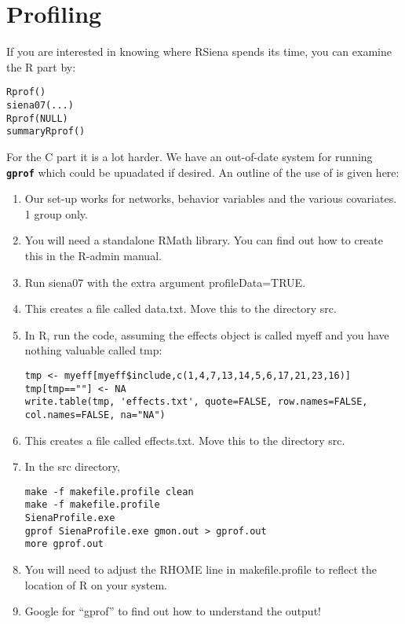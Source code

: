 \documentclass[12pt, a4paper]{article}
\renewcommand{\=}{\,=\,}
\newcommand{\+}{\,+\,}
\newcommand{\sfn}[1]{\textbf{\texttt{#1}}}
\begin{document}
\section{Profiling}
If you are interested in knowing where RSiena spends its time, you can examine
the R part by:
\begin{verbatim}
Rprof()
siena07(...)
Rprof(NULL)
summaryRprof()
\end{verbatim}
For the C part it is a lot harder. We have an out-of-date system for running
\sfn{gprof} which could be upuadated if desired.  An outline of the use of
is given here:
\begin{enumerate}
\item Our set-up works for networks, behavior variables and the various
  covariates. 1 group only.
\item You will need a standalone RMath library. You can find out how to create
  this in the R-admin manual.
\item Run siena07 with the extra argument \textsf{profileData=TRUE}.
\item This creates a file called \textsf{data.txt}. Move this to the directory
  \textsf{src}.
\item In R, run the code, assuming the effects object is called \textsf{myeff}
  and you have nothing valuable called \textsf{tmp}:
\begin{verbatim}
tmp <- myeff[myeff$include,c(1,4,7,13,14,5,6,17,21,23,16)]
tmp[tmp==""] <- NA
write.table(tmp, 'effects.txt', quote=FALSE, row.names=FALSE,
col.names=FALSE, na="NA")
\end{verbatim}
\item This creates a file called \textsf{effects.txt}.  Move this to the
  directory \textsf{src}.
\item In the \textsf{src} directory,
\begin{verbatim}
make -f makefile.profile clean
make -f makefile.profile
SienaProfile.exe
gprof SienaProfile.exe gmon.out > gprof.out
more gprof.out
\end{verbatim}
\item You will need to adjust the \textsf{RHOME} line in
  \textsf{makefile.profile} to reflect the location of R on your system.
\item Google for ``gprof'' to find out how to understand the output!
\end{enumerate}
\end{document}
